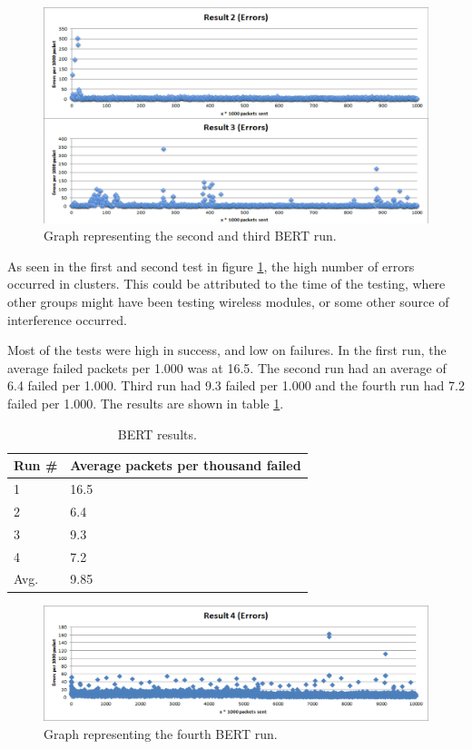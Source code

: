 \begin{figure}[h!]
\hspace*{-2cm}
\includegraphics[width=1.3\textwidth]{chapters/test/figures/res5.png}
\caption{Graph representing the second and third BERT run.}
\label{fig:bert2}
\end{figure}

As seen in the first and second test in figure \ref{fig:bert2}, the high number of errors occurred in clusters. This could be attributed to the time of the testing, where other groups might have been testing wireless modules, or some other source of interference occurred.

Most of the tests were high in success, and low on failures. In the first run, the average failed packets per 1.000 was at 16.5. The second run had an average of 6.4 failed per 1.000. Third run had 9.3 failed per 1.000 and the fourth run had 7.2 failed per 1.000. The results are shown in table \ref{tab:bertresults}.

\begin{table}[ht!]
\centering
\begin{tabular}{ l l }
Run \# & Average packets per thousand failed \\
\hline
1 & 16.5 \\
2 & 6.4 \\
3 & 9.3 \\
4 & 7.2 \\
Avg. & 9.85
\end{tabular}

\label{tab:bertresults}
\caption{BERT results.}
\end{table}



\begin{figure}[h!]
\hspace*{-2cm}
\includegraphics[width=1.3\textwidth]{chapters/test/figures/res4.png}
\caption{Graph representing the fourth BERT run.}
\label{fig:bert3}
\end{figure}

